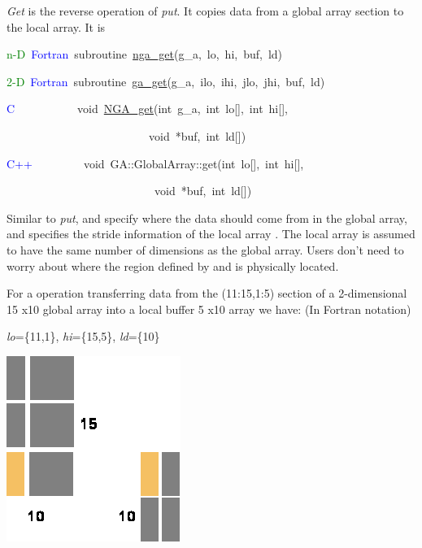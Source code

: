 \emph{Get} is the reverse operation of \emph{put}. It copies data
from a global array section to the local array. It is
\begin{lyxcode}
\textcolor{green}{n-D}~\textcolor{blue}{Fortran}~subroutine~\href{http://www.emsl.pnl.gov/docs/global/ga_ops.html\#ga_get}{nga\_{}get}(g\_a,~lo,~hi,~buf,~ld)~

\textcolor{green}{2-D}~\textcolor{blue}{Fortran}~subroutine~\href{http://www.emsl.pnl.gov/docs/global/ga_ops.html\#ga_get}{ga\_{}get}(g\_a,~ilo,~ihi,~jlo,~jhi,~buf,~ld)~

\textcolor{blue}{C}~~~~~~~~~~~void~\href{http://www.emsl.pnl.gov/docs/global/c_nga_ops.html\#ga_get}{NGA\_{}get}(int~g\_a,~int~lo{[}{]},~int~hi{[}{]},~

~~~~~~~~~~~~~~~~~~~~~~~~~void~{*}buf,~int~ld{[}{]})~

\textcolor{blue}{C++}~~~~~~~~~void~GA::GlobalArray::get(int~lo{[}{]},~int~hi{[}{]},~

~~~~~~~~~~~~~~~~~~~~~~~~~~void~{*}buf,~int~ld{[}{]})
\end{lyxcode}
Similar to \emph{put}, \texttt{} and \texttt{} specify
where the data should come from in the global array, and \texttt{}
specifies the stride information of the local array \texttt{}.
The local array is assumed to have the same number of dimensions as
the global array. Users don't need to worry about where the region
defined by \texttt{} and \texttt{} is physically
located.

\textit{}\textit{\emph{\underbar{:}}}

For a \texttt{} operation transferring data from the
(11:15,1:5) section of a 2-dimensional 15 x10 global array into a
local buffer 5 x10 array we have: (In Fortran notation)

\begin{center}
\emph{lo}=\{11,1\}, \emph{hi}=\{15,5\}, \emph{ld}=\{10\} 
\par\end{center}

\begin{center}
\includegraphics[width=0.4\columnwidth]{GA_get_example}
\par\end{center}


